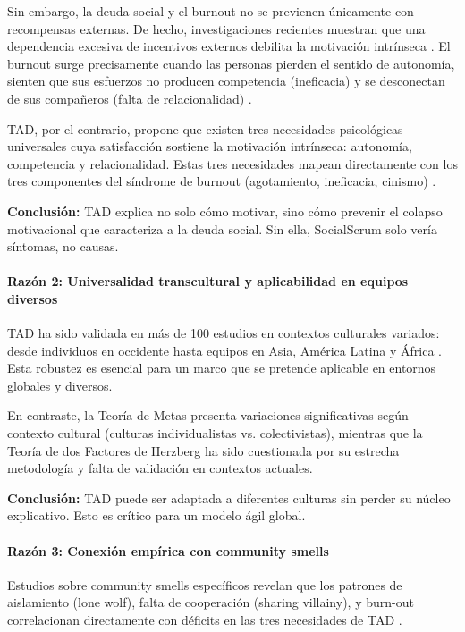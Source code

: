 Sin embargo, la deuda social y el burnout no se previenen únicamente con recompensas externas. De hecho, investigaciones recientes muestran que una dependencia excesiva de incentivos externos debilita la motivación intrínseca \cite{ryan_self-determination_2000, tulili2022burnout}. El burnout surge precisamente cuando las personas pierden el sentido de autonomía, sienten que sus esfuerzos no producen competencia (ineficacia) y se desconectan de sus compañeros (falta de relacionalidad) \cite{tulili2022burnout}.

TAD, por el contrario, propone que existen tres necesidades psicológicas universales cuya satisfacción sostiene la motivación intrínseca: autonomía, competencia y relacionalidad. Estas tres necesidades mapean directamente con los tres componentes del síndrome de burnout (agotamiento, ineficacia, cinismo) \cite{ryan_self-determination_2000, tulili2022burnout}.

\textbf{Conclusión:} TAD explica no solo cómo motivar, sino cómo prevenir el colapso motivacional que caracteriza a la deuda social. Sin ella, SocialScrum solo vería síntomas, no causas.

\paragraph{Razón 2: Universalidad transcultural y aplicabilidad en equipos diversos}

TAD ha sido validada en más de 100 estudios en contextos culturales variados: desde individuos en occidente hasta equipos en Asia, América Latina y África \cite{ryan_self-determination_2000}. Esta robustez es esencial para un marco que se pretende aplicable en entornos globales y diversos.

En contraste, la Teoría de Metas presenta variaciones significativas según contexto cultural (culturas individualistas vs. colectivistas), mientras que la Teoría de dos Factores de Herzberg ha sido cuestionada por su estrecha metodología y falta de validación en contextos actuales.

\textbf{Conclusión:} TAD puede ser adaptada a diferentes culturas sin perder su núcleo explicativo. Esto es crítico para un modelo ágil global.

\paragraph{Razón 3: Conexión empírica con community smells}

Estudios sobre community smells específicos revelan que los patrones de aislamiento (lone wolf), falta de cooperación (sharing villainy), y burn-out correlacionan directamente con déficits en las tres necesidades de TAD \cite{caballero2022communitysmells, saeeda2024nontechnicaldebt}.

